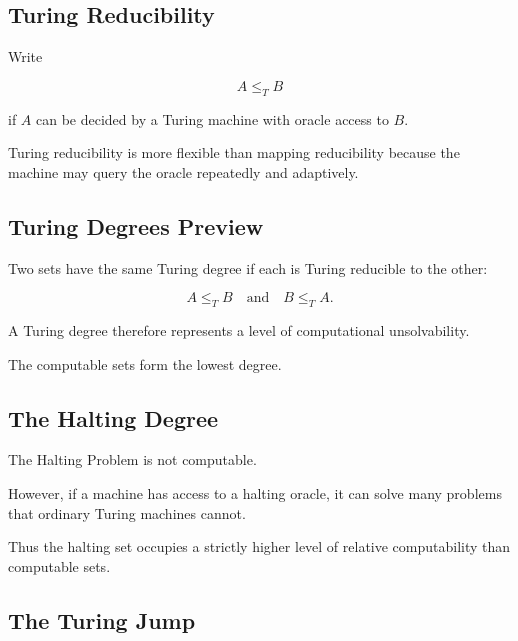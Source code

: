\subsection{Turing Reducibility}
\label{subsec:turing-reducibility}

Write

\[
\boxed{
A
\leq_T
B
}
\]

if \(A\) can be decided by a Turing machine with oracle access to \(B\).

Turing reducibility is more flexible than mapping reducibility because the
machine may query the oracle repeatedly and adaptively.

\subsection{Turing Degrees Preview}
\label{subsec:turing-degrees-preview}

Two sets have the same Turing degree if each is Turing reducible to the
other:

\[
\boxed{
A\leq_TB
\quad\text{and}\quad
B\leq_TA.
}
\]

A Turing degree therefore represents a level of computational
unsolvability.

The computable sets form the lowest degree.

\subsection{The Halting Degree}
\label{subsec:halting-degree}

The Halting Problem is not computable.

However, if a machine has access to a halting oracle, it can solve many
problems that ordinary Turing machines cannot.

Thus the halting set occupies a strictly higher level of relative
computability than computable sets.

\subsection{The Turing Jump}
\label{subsec:turing-jump-preview}

